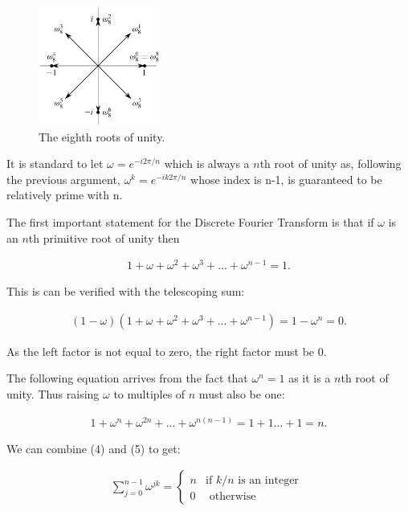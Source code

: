 \documentclass[DIV=calc, paper=a4, fontsize=11pt, twocolumn]{scrartcl}   %
\begin{document}
\begin{figure}[h]
\centering
\includegraphics[width=40mm]{figures/eighthroots.jpg}
\caption{The eighth roots of unity. }
\label{overflow}
\end{figure}


 It is standard to let $\omega = e^{-i2\pi/n}$ which is always a $n$th root of unity as, following the previous argument, $\omega^k = e^{-ik2\pi/n}$ whose index is n-1, is guaranteed to be relatively prime with n.


The first important statement for the Discrete Fourier Transform is that if $\omega$ is an $n$th primitive root of unity then

\begin{align}
1 + \omega + \omega^2 + \omega^3 + ... + \omega^{n-1} = 1.
\end{align}

This is can be verified with the telescoping sum:

\begin{align}
(1 - \omega)(1 + \omega + \omega^2 + \omega^3 + ... + \omega^{n-1}) = 1 - \omega^n = 0.
\end{align}

As the left factor is not equal to zero, the right factor must be 0. \par The following equation arrives from the fact that $\omega^n = 1$ as it is a $n$th root of unity. Thus raising $\omega$ to multiples of $n$ must also be one:

\begin{align}
1 + \omega^n + \omega^{2n} +  ... + \omega^{n(n-1)} = 1 + 1  ...+ 1 = n.
\end{align}

We can combine (4) and (5) to get:


\begin{align}
\sum_{j=0}^{n-1}\omega^{jk} = \left\{
   \begin{array}{ll}
      n  & \mbox{if } k/n \mbox{ is an integer }\\
      0 & \mbox{ otherwise }
   \end{array}
\right.
\end{align}
\end{document}
